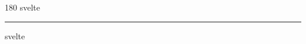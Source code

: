 
\begin{frame}
\begin{center}
\begin{turn}{180}
{\fontsize{2.5cm}{1em}\selectfont svelte}
\end{turn}
\vspace{1em}\par  
\hrule
\vspace{1em}\par  
{\fontsize{2.5cm}{1em}\selectfont svelte}
\end{center}
\end{frame}
